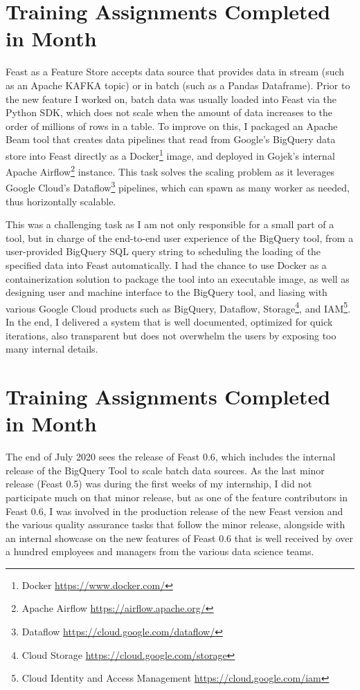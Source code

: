 \documentclass[a4paper, 12pt, fleqn]{report}
\begin{document}
\section{Training Assignments Completed in  Month}
Feast as a Feature Store accepts data source that provides data in stream (such
as an Apache KAFKA topic) or in batch (such as a Pandas Dataframe). Prior to the
new feature I worked on, batch data was usually loaded into Feast via the Python
SDK, which does not scale when the amount of data increases to the order of
millions of rows in a table. To improve on this, I packaged an Apache Beam tool
that creates data pipelines that read from Google's BigQuery data store into
Feast directly as a Docker\footnote{Docker \url{https://www.docker.com/}} image,
and deployed in Gojek's internal Apache Airflow\footnote{Apache Airflow
  \url{https://airflow.apache.org/}} instance. This task solves the scaling
problem as it leverages Google Cloud's Dataflow\footnote{Dataflow
  \url{https://cloud.google.com/dataflow/}} pipelines, which can spawn as many
worker as needed, thus horizontally scalable. \newline

This was a challenging task as I am not only responsible for a small part of a
tool, but in charge of the end-to-end user experience of the BigQuery tool, from
a user-provided BigQuery SQL query string to scheduling the loading of the
specified data into Feast automatically. I had the chance to use Docker as a
containerization solution to package the tool into an executable image, as well
as designing user and machine interface to the BigQuery tool, and liasing with
various Google Cloud products such as BigQuery, Dataflow, Storage\footnote{Cloud
  Storage \url{https://cloud.google.com/storage}}, and IAM\footnote{Cloud
  Identity and Access Management \url{https://cloud.google.com/iam}}. In the
end, I delivered a system that is well documented, optimized for quick
iterations, also transparent but does not overwhelm the users by exposing too
many internal details.

\section{Training Assignments Completed in  Month}
The end of July 2020 sees the release of Feast 0.6, which includes the internal
release of the BigQuery Tool to scale batch data sources. As the last minor
release (Feast 0.5) was during the first weeks of my internship, I did not
participate much on that minor release, but as one of the feature contributors
in Feast 0.6, I was involved in the production release of the new Feast version
and the various quality assurance tasks that follow the minor release, alongside
with an internal showcase on the new features of Feast 0.6 that is well received
by over a hundred employees and managers from the various data science teams.
\newline
\end{document}
